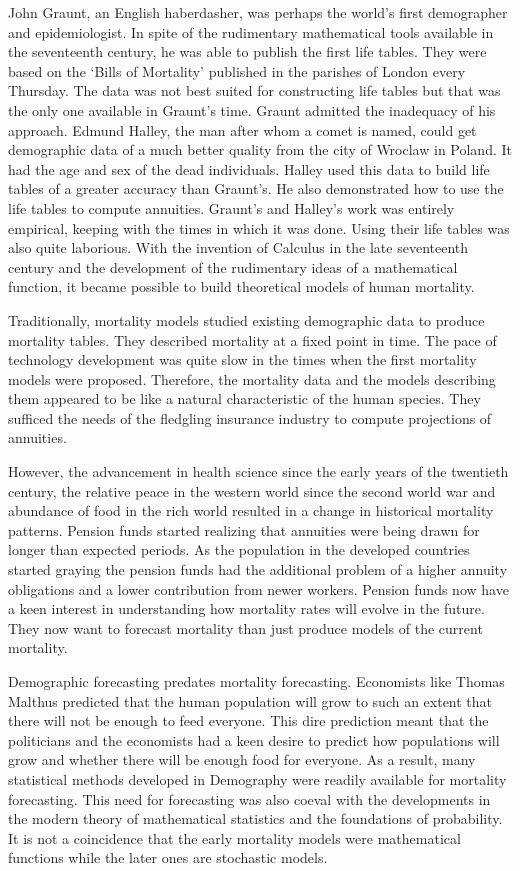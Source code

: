 \documentclass{article}
\numberwithin{equation}{section}
\begin{document}
John Graunt, an English haberdasher, was perhaps the world's first demographer
and epidemiologist. In spite of the rudimentary mathematical tools available
in the seventeenth century, he was able to publish the first life tables. They
were based on the `Bills of Mortality' published in the parishes of London
every Thursday. The data was not best suited for constructing life tables but
that was the only one available in Graunt's time. Graunt admitted the 
inadequacy of his approach. Edmund Halley, the man after whom a comet is 
named, could get demographic data of a much better quality from the city of
Wroclaw in Poland. It had the age and sex of the dead individuals. Halley
used this data to build life tables of a greater accuracy than Graunt's. He
also demonstrated how to use the life tables to compute annuities. Graunt's
and Halley's work was entirely empirical, keeping with the times in which
it was done. Using their life tables was also quite laborious. With the 
invention of Calculus in the late seventeenth century and the development of 
the rudimentary ideas of a mathematical function, it became possible to build
theoretical models of human mortality.

Traditionally, mortality models studied existing demographic data to produce
mortality tables. They described mortality at a fixed point in time. The pace 
of technology development was quite slow in the times when the first mortality
models were proposed. Therefore, the mortality data and the models describing
them appeared to be like a natural characteristic of the human species. They
sufficed the needs of the fledgling insurance industry to compute projections
of annuities.

However, the advancement in health science since the early years of the 
twentieth century, the relative peace in the western world since the second 
world war and abundance of food in the rich world resulted in a change in
historical mortality patterns. Pension funds started realizing that annuities
were being drawn for longer than expected periods. As the population in the
developed countries started graying the pension funds had the additional 
problem of a higher annuity obligations and a lower contribution from newer
workers. Pension funds now have a keen interest in understanding how mortality 
rates will evolve in the future. They now want to forecast mortality than just
produce models of the current mortality. 

Demographic forecasting predates mortality forecasting. Economists like Thomas
Malthus predicted that the human population will grow to such an extent that
there will not be enough to feed everyone. This dire prediction meant that the
politicians and the economists had a keen desire to predict how populations
will grow and whether there will be enough food for everyone. As a result, many 
statistical methods developed in Demography were readily available for mortality
forecasting. This need for forecasting was also coeval with the developments
in the modern theory of mathematical statistics and the foundations of
probability. It is not a coincidence that the early mortality models were
mathematical functions while the later ones are stochastic models.
\end{document}
